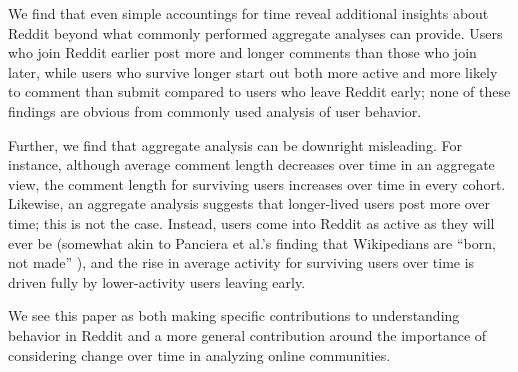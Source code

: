 We find that even simple accountings for time reveal additional insights about Reddit beyond what commonly performed aggregate analyses can provide.  Users who join Reddit earlier post more and longer comments than those who join later, while users who survive longer start out both more active and more likely to comment than submit compared to users who leave Reddit early; none of these findings are obvious from commonly used analysis of user behavior.  

Further, we find that aggregate analysis can be downright misleading.  For instance, although average comment length decreases over time in an aggregate view, the comment length for surviving users increases over time in every cohort.  Likewise, an aggregate analysis suggests that longer-lived users post more over time; this is not the case.  Instead, users come into Reddit as active as they will ever be (somewhat akin to Panciera et al.'s finding that Wikipedians are ``born, not made'' \cite{Panciera2009}), and the rise in average activity for surviving users over time is driven fully by lower-activity users leaving early.     

We see this paper as both making specific contributions to understanding behavior in Reddit and a more general contribution around the importance of considering change over time in analyzing online communities. 




